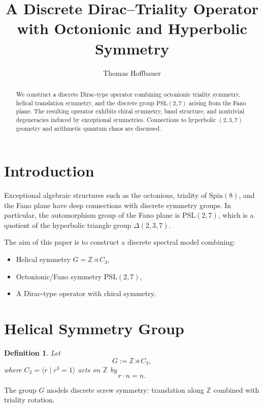 \documentclass[11pt]{article}
\title{A Discrete Dirac--Triality Operator with Octonionic and Hyperbolic Symmetry}
\author{Thomas Hoffbauer}
\date{}
\newtheorem{definition}{Definition}
\begin{document}
	
	\maketitle
	
	\begin{abstract}
		We construct a discrete Dirac-type operator combining octonionic
		triality symmetry, helical translation symmetry, and the discrete
		group $\mathrm{PSL}(2,7)$ arising from the Fano plane.
		The resulting operator exhibits chiral symmetry, band structure,
		and nontrivial degeneracies induced by exceptional symmetries.
		Connections to hyperbolic $(2,3,7)$ geometry and arithmetic quantum
		chaos are discussed.
	\end{abstract}
	
	\section{Introduction}
	
	Exceptional algebraic structures such as the octonions,
	triality of $\mathrm{Spin}(8)$, and the Fano plane
	have deep connections with discrete symmetry groups.
	In particular, the automorphism group of the Fano plane
	is $\mathrm{PSL}(2,7)$, which is a quotient of the hyperbolic
	triangle group $\Delta(2,3,7)$.
	
	The aim of this paper is to construct a discrete spectral model
	combining:
	
	\begin{itemize}
		\item Helical symmetry $G = \mathbb Z \rtimes C_3$,
		\item Octonionic/Fano symmetry $\mathrm{PSL}(2,7)$,
		\item A Dirac-type operator with chiral symmetry.
	\end{itemize}
	
	\section{Helical Symmetry Group}
	
	\begin{definition}
		Let
		\[
		G := \mathbb Z \rtimes C_3,
		\]
		where $C_3 = \langle r \mid r^3 = 1\rangle$ acts on $\mathbb Z$
		by
		\[
		r \cdot n = n.
		\]
	\end{definition}
	
	The group $G$ models discrete screw symmetry:
	translation along $\mathbb Z$ combined with triality rotation.
	
\end{document}
